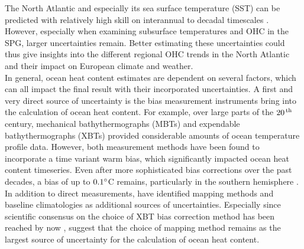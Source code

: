 \documentclass[Masterarbeit.tex]{subfile}
\begin{document}
	The North Atlantic and especially its sea surface temperature (SST) can be predicted with relatively high skill on interannual to decadal timescales \citep{buckley_predictability_2019}. However, especially when examining subsurface temperatures and OHC in the SPG, larger uncertainties remain. Better estimating these uncertainties could thus give insights into the different regional OHC trends in the North Atlantic and their impact on European climate and weather. \\
	In general, ocean heat content estimates are dependent on several factors, which can all impact the final result with their incorporated uncertainties. A first and very direct source of uncertainty is the bias measurement instruments bring into the calculation of ocean heat content. For example, over large parts of the $20^{\,\mathrm{th}}$ century, mechanical bathythermographs (MBTs) and expendable bathythermographs (XBTs) provided considerable amounts of ocean temperature profile data. However, both measurement methods have been found to incorporate a time variant warm bias, which significantly impacted ocean heat content timeseries. Even after more sophisticated bias corrections over the past decades, a bias of up to $0.1\degree$C remains, particularly in the southern hemisphere \citep{gouretski_correction_2020}. In addition to direct measurements, \cite{boyer_sensitivity_2016} have identified mapping methods and baseline climatologies as additional sources of uncertainties. Especially since scientific consensus on the choice of XBT bias correction method has been reached by now \citep{garcia-soto_overview_2021}, \cite{boyer_sensitivity_2016} suggest that the choice of mapping method remains as the largest source of uncertainty for the calculation of ocean heat content. \\
	
\end{document}
